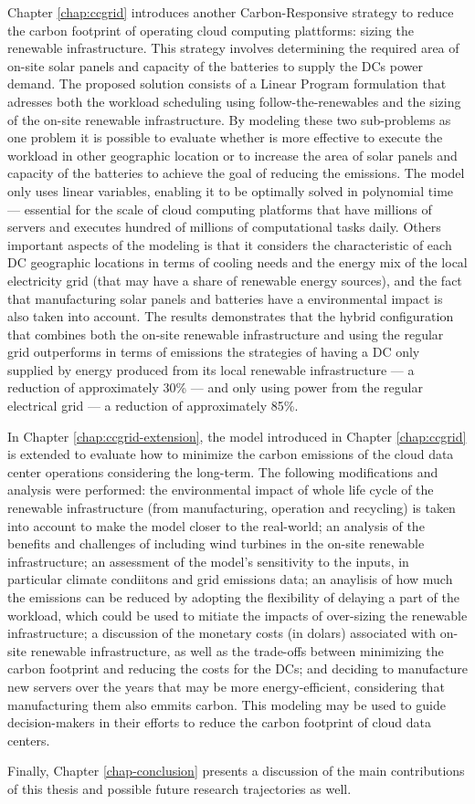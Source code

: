 Chapter \ref{chap:ccgrid} introduces another Carbon-Responsive strategy to reduce the carbon footprint of operating cloud computing plattforms: sizing the renewable infrastructure. This strategy involves determining the required area of on-site solar panels and capacity of the batteries to supply the DCs power demand. The proposed solution consists of a Linear Program formulation that adresses both the workload scheduling using follow-the-renewables and the sizing of the on-site renewable infrastructure. By modeling these two sub-problems as one problem it is possible to evaluate whether is more effective to execute the workload in other geographic location or to increase the area of solar panels and capacity of the batteries to achieve the goal of reducing the  emissions. The model only uses linear variables, enabling it to be optimally solved in polynomial time --- essential for the scale of cloud computing platforms that have millions of servers and executes hundred of millions of computational tasks daily. Others important aspects of the modeling is that it considers the characteristic of each DC geographic locations in terms of cooling needs and the energy mix of the local electricity grid (that may have a share of renewable energy sources), and the fact that manufacturing solar panels and batteries have a environmental impact is also taken into account. The results demonstrates that the hybrid configuration that combines both the on-site renewable infrastructure and using the regular grid outperforms in terms of  emissions the strategies of having a DC only supplied by energy produced from its local renewable infrastructure --- a reduction of approximately 30\% --- and only using power from the regular electrical grid --- a reduction of approximately 85\%.

In Chapter \ref{chap:ccgrid-extension}, the model introduced in Chapter \ref{chap:ccgrid} is extended to evaluate how to minimize the carbon emissions of the cloud data center operations considering the long-term. The following modifications and analysis were performed: the environmental impact of whole life cycle of the renewable infrastructure (from manufacturing, operation and recycling) is taken into account to make the model closer to the real-world; an analysis of the benefits and challenges of including wind turbines in the on-site renewable infrastructure; an assessment of the model's sensitivity to the inputs, in particular climate condiitons and grid emissions data; an anaylisis of how much the  emissions can be reduced by adopting the flexibility of delaying a part of the workload, which could be used to mitiate the impacts of over-sizing the renewable infrastructure; a discussion of the monetary costs (in dolars) associated with on-site renewable infrastructure, as well as the trade-offs between minimizing the carbon footprint and reducing the costs for the DCs; and deciding to manufacture new servers over the years that may be more energy-efficient, considering that manufacturing them also emmits carbon. This modeling may be used to guide decision-makers in their efforts to reduce the carbon footprint of cloud data centers.


Finally, Chapter \ref{chap-conclusion} presents a discussion of the main contributions of this thesis and possible future research trajectories as well.

